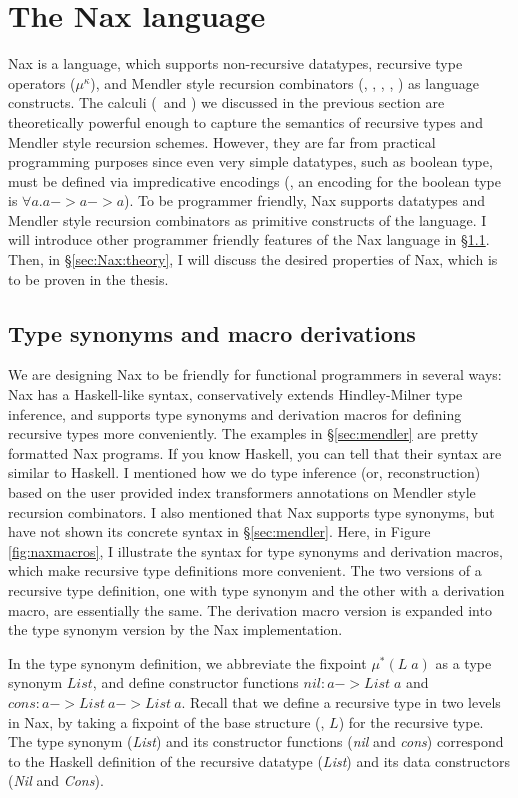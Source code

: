 \section{The Nax language}\label{sec:Nax}

Nax is a language, which supports non-recursive datatypes, recursive type
operators ($\mu^\kappa$), and Mendler style recursion combinators (\MIt, \MPr,
\McvIt, \McvPr, \MsfIt) as language constructs. The calculi (\Fi\ and \Fixi)
we discussed in the previous section are theoretically powerful enough to
capture the semantics of recursive types and Mendler style recursion schemes.
However, they are far from practical programming purposes since even very simple
datatypes, such as boolean type, must be defined via impredicative encodings
(\eg, an encoding for the boolean type is $\forall a . a -> a -> a$). To be
programmer friendly, Nax supports datatypes and Mendler style recursion
combinators as primitive constructs of the language. I will introduce other
programmer friendly features of the Nax language in \S\ref{sec:Nax:tysym}.
Then, in \S\ref{sec:Nax:theory}, I will discuss the desired properties of Nax,
which is to be proven in the thesis.

\subsection{Type synonyms and macro derivations}\label{sec:Nax:tysym}
We are designing Nax to be friendly for functional programmers in several ways:
Nax has a Haskell-like syntax, conservatively extends Hindley-Milner
type inference, and supports type synonyms and derivation macros for defining
recursive types more conveniently. The examples in \S\ref{sec:mendler}
are pretty formatted Nax programs. If you know Haskell, you can tell
that their syntax are similar to Haskell. I mentioned how we do
type inference (or, reconstruction) based on the user provided
index transformers annotations on Mendler style recursion combinators.
I also mentioned that Nax supports type synonyms, but have not shown its
concrete syntax in \S\ref{sec:mendler}. Here, in Figure \ref{fig:naxmacros},
I illustrate the syntax for type synonyms and derivation macros, which make
recursive type definitions more convenient. The two versions of
a recursive type definition, one with type synonym and
the other with a derivation macro, are essentially the same.
The derivation macro version is expanded into the type synonym version
by the Nax implementation.

In the type synonym definition, we abbreviate the fixpoint $\mu^{*}(L\;a)$
as a type synonym $List$, and define constructor functions
$\textit{nil} : a -> \textit{List}\;a$ and
$\textit{cons} : a -> \textit{List}~a -> \textit{List}~a$.
Recall that we define a recursive type in two levels in Nax,
by taking a fixpoint of the base structure (\eg, $L$) for the recursive type.
The type synonym (\textit{List}) and its constructor functions
(\textit{nil} and \textit{cons}) correspond to the Haskell definition of
the recursive datatype (\textit{List}) and its data constructors
(\textit{Nil} and \textit{Cons}).

